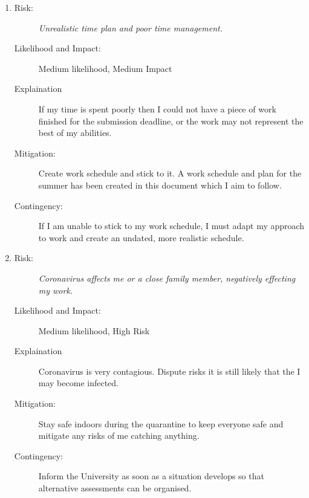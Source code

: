 \documentclass{article}
\begin{document}


\begin{enumerate}
    \item 
    \begin{description}
        \item[Risk:]    
        \emph{Unrealistic time plan and poor time management.}
        \item[Likelihood and Impact:]
        Medium likelihood, Medium Impact
        \item[Explaination]
        If my time is spent poorly then I could not have a piece of work finished for the submission deadline, or the work may not represent the best of my abilities.  
        \item[Mitigation:]
        Create work schedule and stick to it.
        A work schedule and plan for the summer has been created in this document which I aim to follow.
        \item[Contingency:]
        If I am unable to stick to my work schedule, I must adapt my approach to work and create an undated, more realistic schedule.
    \end{description}

    \item 
    \begin{description}
        \item[Risk:]
        \emph{Coronavirus affects me or a close family member, negatively effecting my work.}
        \item[Likelihood and Impact:]
        Medium likelihood, High Risk
        \item[Explaination]
        Coronavirus is very contagious. 
        Dispute risks it is still likely that the I may become infected. 
        \item[Mitigation:]
        Stay safe indoors during the quarantine to keep everyone safe and mitigate any risks of me catching anything.
        \item[Contingency:]
        Inform the University as soon as a situation develops so that alternative assessments can be organised.
    \end{description}


\end{enumerate}
\end{document}
